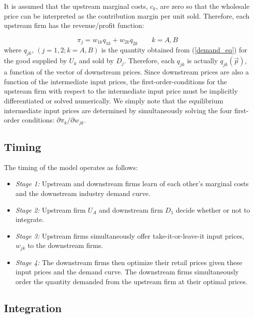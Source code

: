 \documentclass[12pt]{article}%
\begin{document}
It is assumed that the upstream marginal costs, $c_k$, are zero so that the wholesale price can be interpreted as the contribution margin per unit sold. Therefore, each upstream firm has the revenue/profit function:

\begin{equation}
    \pi_j = w_{1k}q_{1k} + w_{2k}q_{2k} \qquad k = A,B
\end{equation}
where $q_{jk}, \, (j = 1,2; k = A,B)$ is the quantity obtained from (\ref{demand_eq}) for the good supplied by $U_k$ and sold by $D_j$. Therefore, each $q_{jk}$ is actually $q_{jk}(\vec{p})$, a function of the vector of downstream prices. Since downstream prices are also a function of the intermediate input prices, the first-order-conditions for the upstream firm with respect to the intermediate input price must be implicitly differentiated or solved numerically. We simply note that the equilibrium intermediate input prices are determined by simultaneously solving the four first-order conditions: $\partial \pi_k/\partial w_{jk}$. 



\subsection{Timing}

The timing of the model operates as follows:

\begin{itemize}
    \item \textit{Stage 1:} Upstream and downstream firms learn of each other's marginal costs and the downstream industry demand curve. 
    \item \textit{Stage 2:} Upstream firm $U_A$ and downstream firm $D_1$ decide whether or not to integrate.
    \item \textit{Stage 3:} Upstream firms simultaneously offer take-it-or-leave-it input prices, $w_{jk}$ to the downstream firms. 
    \item \textit{Stage 4:} The downstream firms then optimize their retail prices given these input prices and the demand curve. The downstream firms simultaneously order the quantity demanded from the upstream firm at their optimal prices. 
\end{itemize}

\subsection{Integration}
\end{document}
